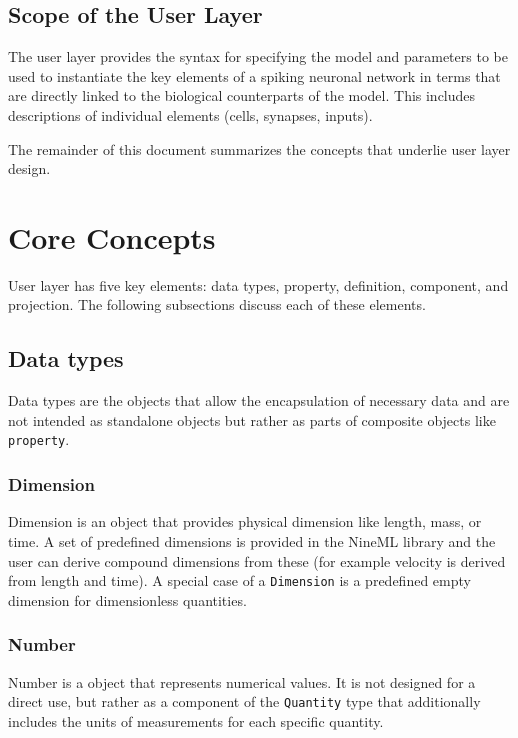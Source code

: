 \documentclass{article}
\begin{document}
\subsection{Scope of the User Layer}

The user layer provides the syntax for specifying the model and parameters to
be used to instantiate the key elements of a spiking neuronal network in terms
that are directly linked to the biological counterparts of the model. This
includes descriptions of individual elements (cells, synapses, inputs).

The remainder of this document summarizes the concepts that underlie user
layer design.

\section{Core Concepts}

User layer has five key elements: data types, property, definition,
component, and projection. The following subsections
discuss each of these elements.

\subsection{Data types}

Data types are the objects that allow the encapsulation of necessary data
and are not intended as standalone objects but rather as parts of composite
objects like {\tt property}.

\subsubsection{Dimension}

Dimension is an object that provides physical dimension like length,
mass, or time. A set of predefined dimensions is provided in the
NineML library and the user can derive compound dimensions from these
(for example velocity is derived from length and time). A special case
of a {\tt Dimension} is a predefined empty dimension for dimensionless
quantities.

\subsubsection{Number}

Number is a object that represents numerical values. It is not designed for
a direct use, but rather as a component of the {\tt Quantity} type that
additionally includes the units of measurements for each specific quantity.
\end{document}
